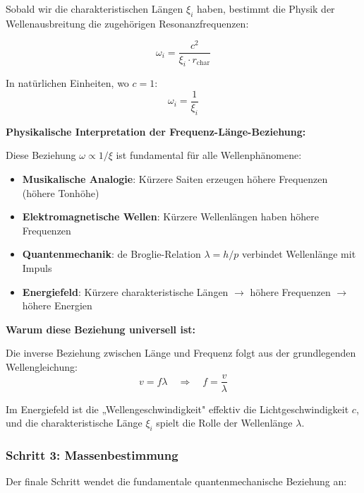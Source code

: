 \documentclass[12pt,a4paper]{article}
\begin{document}
	Sobald wir die charakteristischen Längen $\xi_i$ haben, bestimmt die Physik der Wellenausbreitung die zugehörigen Resonanzfrequenzen:
	
	\begin{equation}
		\omega_i = \frac{c^2}{\xi_i \cdot r_{\text{char}}}
		\label{eq:resonance_frequencies}
	\end{equation}
	
	In natürlichen Einheiten, wo $c = 1$:
	\begin{equation}
		\omega_i = \frac{1}{\xi_i}
		\label{eq:resonance_natural}
	\end{equation}
	
	\textbf{Physikalische Interpretation der Frequenz-Länge-Beziehung:}
	
	Diese Beziehung $\omega \propto 1/\xi$ ist fundamental für alle Wellenphänomene:
	
	\begin{itemize}
		\item \textbf{Musikalische Analogie}: Kürzere Saiten erzeugen höhere Frequenzen (höhere Tonhöhe)
		\item \textbf{Elektromagnetische Wellen}: Kürzere Wellenlängen haben höhere Frequenzen
		\item \textbf{Quantenmechanik}: de Broglie-Relation $\lambda = h/p$ verbindet Wellenlänge mit Impuls
		\item \textbf{Energiefeld}: Kürzere charakteristische Längen $\rightarrow$ höhere Frequenzen $\rightarrow$ höhere Energien
	\end{itemize}
	
	\textbf{Warum diese Beziehung universell ist:}
	
	Die inverse Beziehung zwischen Länge und Frequenz folgt aus der grundlegenden Wellengleichung:
	\begin{equation}
		v = f \lambda \quad \Rightarrow \quad f = \frac{v}{\lambda}
	\end{equation}
	
	Im Energiefeld ist die „Wellengeschwindigkeit" effektiv die Lichtgeschwindigkeit $c$, und die charakteristische Länge $\xi_i$ spielt die Rolle der Wellenlänge $\lambda$.
	
	\subsubsection{Schritt 3: Massenbestimmung}
	\label{subsubsec:step3}
	
	Der finale Schritt wendet die fundamentale quantenmechanische Beziehung an:
	
\end{document}
